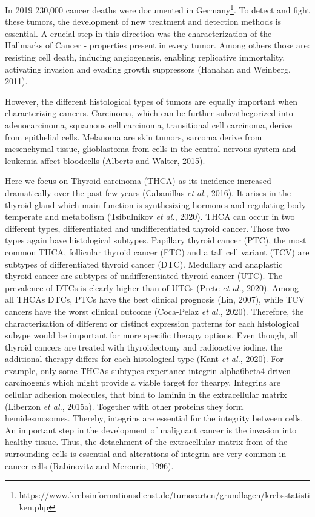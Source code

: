 \documentclass[
  parskip,
  oneside]{scrreprt}
\begin{document}
In 2019 230,000 cancer deaths were documented in
Germany\footnote{ https://www.krebsinformationsdienst.de/tumorarten/grundlagen/krebsstatistiken.php}.
To detect and fight these tumors, the development of new treatment and
detection methods is essential. A crucial step in this direction was the
characterization of the Hallmarks of Cancer - properties present in
every tumor. Among others those are: resisting cell death, inducing
angiogenesis, enabling replicative immortality, activating invasion and
evading growth suppressors (Hanahan and Weinberg, 2011).

However, the different histological types of tumors are equally
important when characterizing cancers. Carcinoma, which can be further
subcathegorized into adenocarcinoma, squamous cell carcinoma,
transitional cell carcinoma, derive from epithelial cells. Melanoma are
skin tumors, sarcoma derive from mesenchymal tissue, glioblastoma from
cells in the central nervous system and leukemia affect bloodcells
(Alberts and Walter, 2015).

Here we focus on Thyroid carcinoma (THCA) as its incidence increased
dramatically over the past few years (Cabanillas \emph{et al.}, 2016).
It arises in the thyroid gland which main function is synthesizing
hormones and regulating body temperate and metabolism (Tsibulnikov
\emph{et al.}, 2020). THCA can occur in two different types,
differentiated and undifferentiated thyroid cancer. Those two types
again have histological subtypes. Papillary thyroid cancer (PTC), the
most common THCA, follicular thyroid cancer (FTC) and a tall cell
variant (TCV) are subtypes of differentiated thyroid cancer (DTC).
Medullary and anaplastic thyroid cancer are subtypes of undifferentiated
thyroid cancer (UTC). The prevalence of DTCs is clearly higher than of
UTCs (Prete \emph{et al.}, 2020). Among all THCAs DTCs, PTCs have the
best clinical prognosis (Lin, 2007), while TCV cancers have the worst
clinical outcome (Coca-Pelaz \emph{et al.}, 2020). Therefore, the
characterization of different or distinct expression patterns for each
histological subype would be important for more specific therapy
options. Even though, all thyroid cancers are treated with thyroidectomy
and radioactive iodine, the additional therapy differs for each
histological type (Kant \emph{et al.}, 2020). For example, only some
THCAs subtypes experiance integrin alpha6beta4 driven carcinogenis which
might provide a viable target for thearpy. Integrins are cellular
adhesion molecules, that bind to laminin in the extracellular matrix
(Liberzon \emph{et al.}, 2015a). Together with other proteins they form
hemidesmosomes. Thereby, integrins are essential for the integrity
between cells. An important step in the development of malignant cancer
is the invasion into healthy tissue. Thus, the detachment of the
extracellular matrix from of the surrounding cells is essential and
alterations of integrin are very common in cancer cells (Rabinovitz and
Mercurio, 1996).
\end{document}
